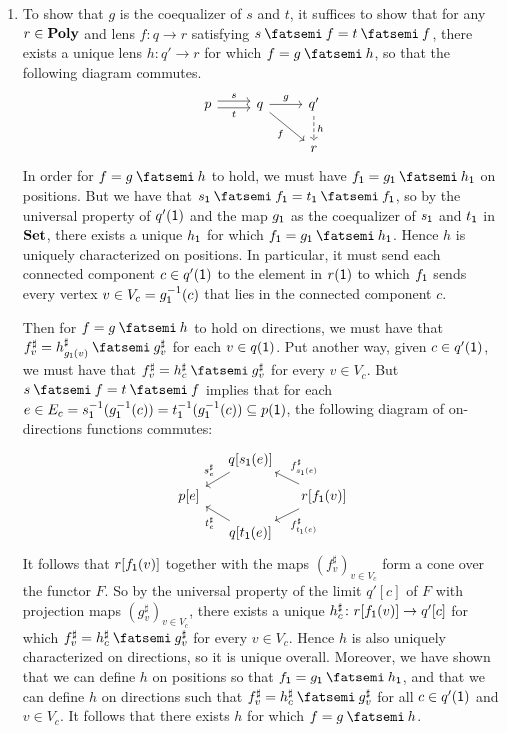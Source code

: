 \documentclass[Book-Poly]{subfiles}
\begin{document}
\begin{exercise}
\begin{solution}
\begin{enumerate}
    \item To show that $g$ is the coequalizer of $s$ and $t$, it suffices to show that for any $r \in \mathbf{Poly}$ and lens $f \colon q \to r$ satisfying $s \then f = t \then f$, there exists a unique lens $h \colon q' \to r$ for which $f = g \then h$, so that the following diagram commutes.
    \begin{equation*} %
    \begin{tikzcd}
        p \ar[r, "s", shift left] \ar[r, "t"', shift right] & q \ar[r, "g"] \ar[dr, "f"'] & q' \ar[d, "h", dashed] \\
        & & r
    \end{tikzcd}
    \end{equation*}
    In order for $f = g \then h$ to hold, we must have $f_\1 = g_\1 \then h_\1$ on positions.
    But we have that $s_\1 \then f_\1 = t_\1 \then f_\1$, so by the universal property of $q'(\textsf{1})$ and the map $g_{\textsf{1}}$ as the coequalizer of $s_{\textsf{1}}$ and $t_{\textsf{1}}$ in $\mathbf{Set}$, there exists a unique $h_{\textsf{1}}$ for which $f_\1 = g_\1 \then h_\1$.
    Hence $h$ is uniquely characterized on positions.
    In particular, it must send each connected component $c \in q'(\textsf{1})$ to the element in $r(\textsf{1})$ to which $f_{\textsf{1}}$ sends every vertex $v \in V_c = g_{\textsf{1}}^{-1}(c)$ that lies in the connected component $c$.

    Then for $f = g \then h$ to hold on directions, we must have that $f^\sharp_v = h^\sharp_{g_\1(v)} \then g^\sharp_v$ for each $v \in q(\textsf{1})$.
    Put another way, given $c \in q'(\textsf{1})$, we must have that $f^\sharp_v = h^\sharp_c \then g^\sharp_v$ for every $v \in V_c$.
    But $s \then f = t \then f$ implies that for each $e \in E_c = s_{\textsf{1}}^{-1}(g_{\textsf{1}}^{-1}(c)) = t_{\textsf{1}}^{-1}(g_{\textsf{1}}^{-1}(c)) \subseteq p(\textsf{1})$, the following diagram of on-directions functions commutes:
    \[
    \begin{tikzcd}[sep=small]
        & q[s_\1(e)] \ar[dl, "s^\sharp_e"'] \\
        p[e] & & r[f_\1(v)] \ar[ul, "f^\sharp_{s_\1(e)}"'] \ar[dl, "f^\sharp_{t_\1(e)}"] \\
        & q[t_\1(e)] \ar[ul, "t^\sharp_e"]
    \end{tikzcd}
    \]
    It follows that $r[f_{\textsf{1}}(v)]$ together with the maps $(f^\sharp_v)_{v \in V_c}$ form a cone over the functor $F$.
    So by the universal property of the limit $q'[c]$ of $F$ with projection maps $(g^\sharp_v)_{v \in V_c}$, there exists a unique $h^\sharp_c \colon r[f_{\textsf{1}}(v)] \to q'[c]$ for which $f^\sharp_v = h^\sharp_c \then g^\sharp_v$ for every $v \in V_c$.
    Hence $h$ is also uniquely characterized on directions, so it is unique overall.
    Moreover, we have shown that we can define $h$ on positions so that $f_\1 = g_\1 \then h_\1$, and that we can define $h$ on directions such that $f^\sharp_v = h^\sharp_c \then g^\sharp_v$ for all $c \in q'(\textsf{1})$ and $v \in V_c$.
    It follows that there exists $h$ for which $f = g \then h$.
\end{enumerate}
\end{solution}
\end{exercise}
\end{document}
